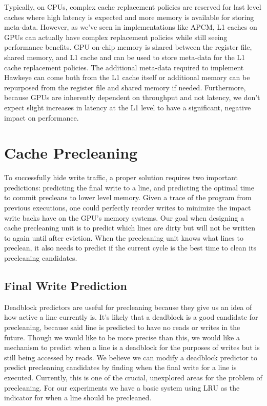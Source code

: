 Typically, on CPUs, complex cache replacement policies are reserved for last level caches where high latency is expected and more memory is available for storing meta-data. However, as we’ve seen in implementations like APCM, L1 caches on GPUs can actually have complex replacement policies while still seeing performance benefits. GPU on-chip memory is shared between the register file, shared memory, and L1 cache and can be used to store meta-data for the L1 cache replacement policies. The additional meta-data required to implement Hawkeye can come both from the L1 cache itself or additional memory can be repurposed from the register file and shared memory if needed. Furthermore, because GPUs are inherently dependent on throughput and not latency, we don't expect slight increases in latency at the L1 level to have a significant, negative impact on performance.

\section{Cache Precleaning}

To successfully hide write traffic, a proper solution requires two important predictions: predicting the final write to a line, and predicting the optimal time to commit precleans to lower level memory. Given a trace of the program from previous executions, one could perfectly reorder writes to minimize the impact write backs have on the GPU's memory systems. Our goal when designing a cache precleaning unit is to predict which lines are dirty but will not be written to again until after eviction. When the precleaning unit knows what lines to preclean, it also needs to predict if the current cycle is the best time to clean its precleaning candidates.

\subsection{Final Write Prediction}
Deadblock predictors are useful for precleaning because they give us an idea of how active a line currently is. It's likely that a deadblock is a good candidate for precleaning, because said line is predicted to have no reads or writes in the future. Though we would like to be more precise than this, we would like a mechanism to predict when a line is a deadblock for the purposes of writes but is still being accessed by reads. We believe we can modify a deadblock predictor to predict precleaning candidates by finding when the final write for a line is executed. Currently, this is one of the crucial, unexplored areas for the problem of precleaning. For our experiments we have a basic system using LRU as the indicator for when a line should be precleaned.

